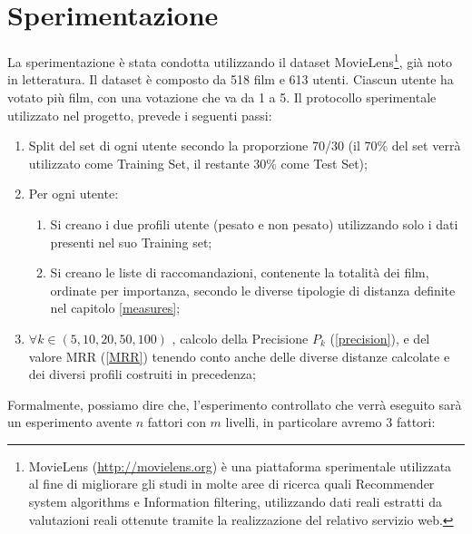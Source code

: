 \section{Sperimentazione}
\label{experiment}

La sperimentazione è stata condotta utilizzando il dataset MovieLens\footnote{MovieLens (\url{http://movielens.org}) è una piattaforma sperimentale utilizzata al fine di migliorare gli studi in molte aree di ricerca quali Recommender system algorithms e Information filtering, utilizzando dati reali estratti da valutazioni reali ottenute tramite la realizzazione del relativo servizio web.}, già noto in letteratura.
Il dataset è composto da 518 film e 613 utenti. Ciascun utente ha votato più film, con una votazione che va da 1 a 5.
Il protocollo sperimentale utilizzato nel progetto, prevede i seguenti passi:
\begin{enumerate}
\item Split del set di ogni utente secondo la proporzione 70/30 (il 70\% del set verrà utilizzato come Training Set, il restante 30\% come Test Set);
\item Per ogni utente:
    \begin{enumerate}
        \item Si creano i due profili utente (pesato e non pesato) utilizzando solo i dati presenti nel suo Training set;
        \item Si creano le liste di raccomandazioni, contenente la totalità dei film, ordinate per importanza, secondo le diverse tipologie di distanza definite nel capitolo \ref{measures};
    \end{enumerate}
\item $\forall k \in (5,10,20,50,100)$ , calcolo della Precisione $P_k$ (\ref{precision}), e del valore MRR (\ref{MRR}) tenendo conto anche delle diverse distanze calcolate e dei diversi profili costruiti in precedenza;
\end{enumerate}
Formalmente, possiamo dire che, l'esperimento controllato che verrà eseguito sarà un esperimento avente $n$ fattori con $m$ livelli, in particolare avremo 3 fattori:
